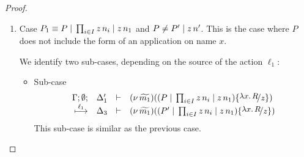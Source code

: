 \begin{proof}
\begin{enumerate}
		\item	Case $P_1 \equiv P \;|\; \prod_{i \in I} z\, {n_i} \;|\; z\, {n_1}$ and
				$P \not= P' \;|\; z\, {n'}$. This is the case where $P$ does not include the form
				of an application on name $x$.

				We identify two sub-cases, depending on the source of the action $\ell_1$:
				\begin{itemize}
					\item	Sub-case
							\begin{eqnarray*}
								\mhorel{\Gamma}{\Delta_1'}{\newsp{\widetilde{m_1}}{(P \Par \prod_{i \in I} \appl{z}{n_i} \Par \appl{z}{n_1}) \subst{{\abs{x}{R}}}{z} }}
								{\hby{\ell_1}}
								{\Delta_3}{}{\newsp{\widetilde{m_1}}{(P' \Par \prod_{i \in I} \appl{z}{n_i} \Par \appl{z}{n_1}) \subst{{\abs{x}{R}}}{z} }}
							\end{eqnarray*}
							This sub-case is similar as the previous case.


\end{itemize}
\end{enumerate}
\end{proof}
